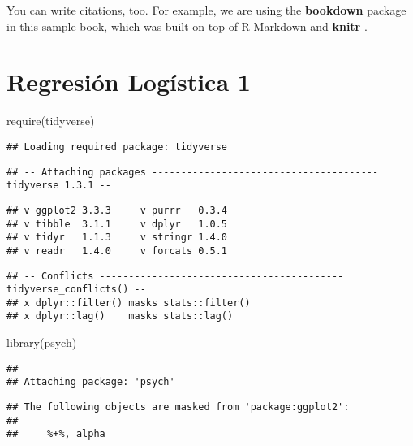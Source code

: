 \documentclass[
]{book}
\newenvironment{Shaded}{\begin{snugshade}}{\end{snugshade}}
\newcommand{\FunctionTok}[1]{\textcolor[rgb]{0.00,0.00,0.00}{#1}}
\newcommand{\NormalTok}[1]{#1}
\begin{document}
You can write citations, too. For example, we are using the \textbf{bookdown} package \citep{R-bookdown} in this sample book, which was built on top of R Markdown and \textbf{knitr} \citep{xie2015}.

\hypertarget{regresiuxf3n-loguxedstica-1}{%
\chapter{Regresión Logística 1}\label{regresiuxf3n-loguxedstica-1}}

\begin{Shaded}
\begin{Highlighting}[]
\FunctionTok{require}\NormalTok{(tidyverse)}
\end{Highlighting}
\end{Shaded}

\begin{verbatim}
## Loading required package: tidyverse
\end{verbatim}

\begin{verbatim}
## -- Attaching packages --------------------------------------- tidyverse 1.3.1 --
\end{verbatim}

\begin{verbatim}
## v ggplot2 3.3.3     v purrr   0.3.4
## v tibble  3.1.1     v dplyr   1.0.5
## v tidyr   1.1.3     v stringr 1.4.0
## v readr   1.4.0     v forcats 0.5.1
\end{verbatim}

\begin{verbatim}
## -- Conflicts ------------------------------------------ tidyverse_conflicts() --
## x dplyr::filter() masks stats::filter()
## x dplyr::lag()    masks stats::lag()
\end{verbatim}

\begin{Shaded}
\begin{Highlighting}[]
\FunctionTok{library}\NormalTok{(psych)}
\end{Highlighting}
\end{Shaded}

\begin{verbatim}
## 
## Attaching package: 'psych'
\end{verbatim}

\begin{verbatim}
## The following objects are masked from 'package:ggplot2':
## 
##     %+%, alpha
\end{verbatim}
\end{document}
